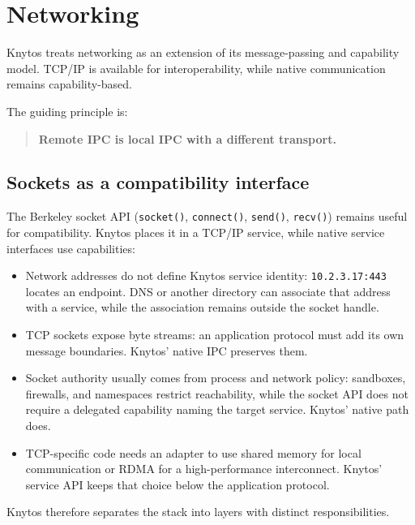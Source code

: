 \chapter{Networking}
\label{chap:networking}

Knytos treats networking as an extension of its message-passing and
capability model. TCP/IP is available for interoperability, while native
communication remains capability-based.

The guiding principle is:

\begin{quote}
\textbf{Remote IPC is local IPC with a different transport.}
\end{quote}

\section{Sockets as a compatibility interface}

The Berkeley socket API (\texttt{socket()}, \texttt{connect()}, \texttt{send()},
\texttt{recv()}) remains useful for compatibility. Knytos places it in a
TCP/IP service, while native service interfaces use capabilities:

\begin{itemize}
    \item Network addresses do not define Knytos service identity:
        \texttt{10.2.3.17:443} locates an endpoint. DNS or another directory can
        associate that address with a service, while the association remains
        outside the socket handle.

    \item TCP sockets expose byte streams: an application protocol must add its
        own message boundaries. Knytos' native IPC preserves them.

    \item Socket authority usually comes from process and network policy:
        sandboxes, firewalls, and namespaces restrict reachability, while the
        socket API does not require a delegated capability naming the target
        service. Knytos' native path does.

    \item TCP-specific code needs an adapter to use shared memory for local
        communication or RDMA for a high-performance interconnect. Knytos'
        service API keeps that choice below the application protocol.
\end{itemize}

Knytos therefore separates the stack into layers with distinct
responsibilities.

